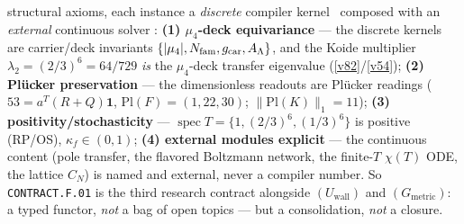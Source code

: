 structural axioms, each instance a \emph{discrete} compiler kernel \mE\ composed with an \emph{external}
continuous solver \mC: \textbf{(1) $\mu_4$-deck equivariance} --- the discrete kernels are carrier/deck
invariants $\{|\mu_4|,N_{\mathrm{fam}},g_{\mathrm{car}},A_\Lambda\}$, and the Koide multiplier $\lambda_2{=}(2/3)^6{=}64/729$
\emph{is} the $\mu_4$-deck transfer eigenvalue (\vref{v82}/\vref{v54}); \textbf{(2) Pl\"ucker preservation}
--- the dimensionless readouts are Pl\"ucker readings ($53{=}a^T(R{+}Q)\mathbf1$, $\mathrm{Pl}(F){=}(1,22,30)$;
$\|\mathrm{Pl}(K)\|_1{=}11$); \textbf{(3) positivity/stochasticity} --- $\operatorname{spec}T{=}\{1,(2/3)^6,(1/3)^6\}$
is positive (RP/OS), $\kappa_f{\in}(0,1)$; \textbf{(4) external modules explicit} --- the continuous content
(pole transfer, the flavored Boltzmann network, the finite-$T$ $\chi(T)$ ODE, the lattice $C_N$) is named and
external, never a compiler number. So \texttt{CONTRACT.F.01} is the third research contract alongside
$(U_{\mathrm{wall}})$ and $(G_{\mathrm{metric}})$: a typed functor, \emph{not} a bag of open topics --- but a
consolidation, \emph{not} a closure.
